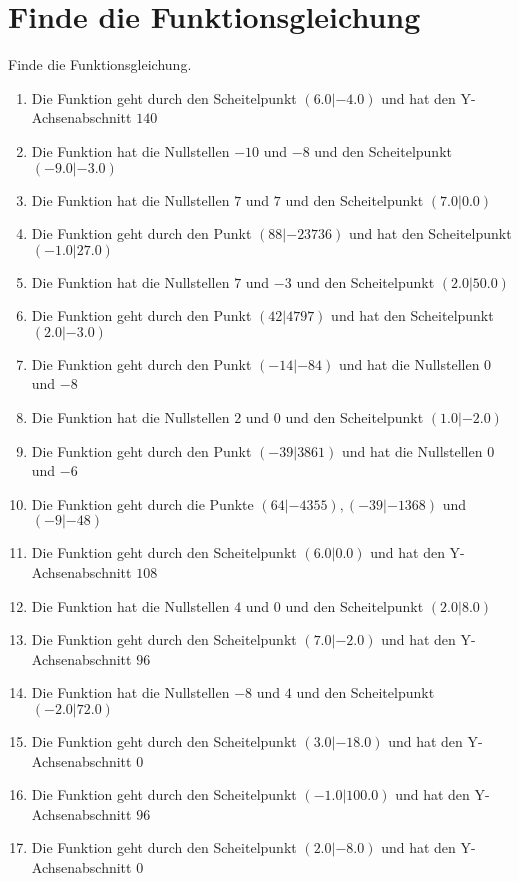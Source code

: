 \documentclass{article}%
\begin{document}
\section{Finde die Funktionsgleichung}%
\label{sec:FindedieFunktionsgleichung}%
Finde die Funktionsgleichung.%
\begin{enumerate}[label=\alph*)]%
\item%
 Die Funktion geht durch den Scheitelpunkt $(6.0|-4.0)$ und hat den Y-Achsenabschnitt $140$%
\item%
 Die Funktion hat die Nullstellen $-10$ und $-8$ und den Scheitelpunkt $(-9.0|-3.0)$%
\item%
 Die Funktion hat die Nullstellen $7$ und $7$ und den Scheitelpunkt $(7.0|0.0)$%
\item%
 Die Funktion geht durch den Punkt $(88|-23736)$ und hat den Scheitelpunkt $(-1.0|27.0)$%
\item%
 Die Funktion hat die Nullstellen $7$ und $-3$ und den Scheitelpunkt $(2.0|50.0)$%
\item%
 Die Funktion geht durch den Punkt $(42|4797)$ und hat den Scheitelpunkt $(2.0|-3.0)$%
\item%
 Die Funktion geht durch den Punkt $(-14|-84)$ und hat die Nullstellen $0$ und $-8$%
\item%
 Die Funktion hat die Nullstellen $2$ und $0$ und den Scheitelpunkt $(1.0|-2.0)$%
\item%
 Die Funktion geht durch den Punkt $(-39|3861)$ und hat die Nullstellen $0$ und $-6$%
\item%
 Die Funktion geht durch die Punkte $(64|-4355),(-39|-1368)$ und $(-9|-48)$%
\item%
 Die Funktion geht durch den Scheitelpunkt $(6.0|0.0)$ und hat den Y-Achsenabschnitt $108$%
\item%
 Die Funktion hat die Nullstellen $4$ und $0$ und den Scheitelpunkt $(2.0|8.0)$%
\item%
 Die Funktion geht durch den Scheitelpunkt $(7.0|-2.0)$ und hat den Y-Achsenabschnitt $96$%
\item%
 Die Funktion hat die Nullstellen $-8$ und $4$ und den Scheitelpunkt $(-2.0|72.0)$%
\item%
 Die Funktion geht durch den Scheitelpunkt $(3.0|-18.0)$ und hat den Y-Achsenabschnitt $0$%
\item%
 Die Funktion geht durch den Scheitelpunkt $(-1.0|100.0)$ und hat den Y-Achsenabschnitt $96$%
\item%
 Die Funktion geht durch den Scheitelpunkt $(2.0|-8.0)$ und hat den Y-Achsenabschnitt $0$%

\end{enumerate}
\end{document}
